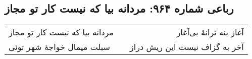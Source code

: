 \begin{center}
\section*{رباعی شماره ۹۶۴: مردانه بیا که نیست کار تو مجاز}
\label{sec:0964}
\begin{longtable}{l p{0.5cm} r}
مردانه بیا که نیست کار تو مجاز
&&
آغاز بنه ترانهٔ بی‌آغاز
\\
سبلت میمال خواجهٔ شهر توئی
&&
آخر به گزاف نیست این ریش دراز
\\
\end{longtable}
\end{center}
